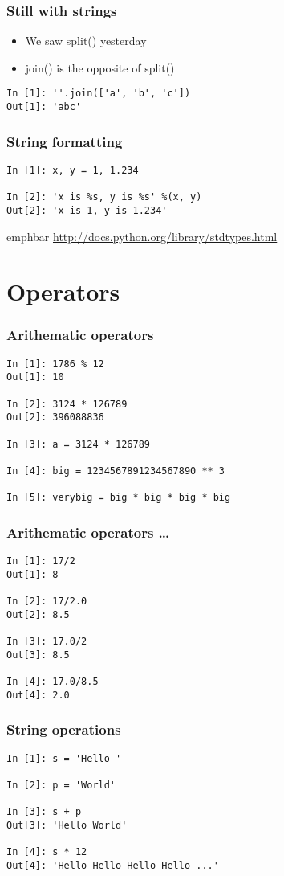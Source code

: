 \documentclass[14pt,compress]{beamer}
\newcommand{\emphbar}[1]
{\begin{beamercolorbox}[rounded=true]{emphbar} 
      {#1}
 \end{beamercolorbox}
}
\newcounter{time}
\newcommand{\inctime}[1]{\addtocounter{time}{#1}{\tiny \thetime\ m}}
\begin{document}
\begin{frame}[fragile]
\frametitle{Still with strings}
  \begin{itemize}
    \item We saw split() yesterday
    \item join() is the opposite of split()
  \end{itemize}
  \begin{lstlisting}
In [1]: ''.join(['a', 'b', 'c'])
Out[1]: 'abc'
  \end{lstlisting}
\end{frame}

\begin{frame}[fragile]
\frametitle{String formatting}
  \begin{lstlisting}
In [1]: x, y = 1, 1.234

In [2]: 'x is %s, y is %s' %(x, y)
Out[2]: 'x is 1, y is 1.234'
  \end{lstlisting}
\emphbar{
\url{http://docs.python.org/library/stdtypes.html}\\
}
\inctime{10}
\end{frame}

\section{Operators}
\begin{frame}[fragile]
  \frametitle{Arithematic operators}
  \begin{lstlisting}
In [1]: 1786 % 12
Out[1]: 10

In [2]: 3124 * 126789
Out[2]: 396088836

In [3]: a = 3124 * 126789

In [4]: big = 1234567891234567890 ** 3

In [5]: verybig = big * big * big * big
  \end{lstlisting}
\end{frame}

\begin{frame}[fragile]
  \frametitle{Arithematic operators \ldots}
  \begin{lstlisting}
In [1]: 17/2
Out[1]: 8

In [2]: 17/2.0
Out[2]: 8.5

In [3]: 17.0/2
Out[3]: 8.5

In [4]: 17.0/8.5
Out[4]: 2.0
  \end{lstlisting}
\end{frame}

\begin{frame}[fragile]
  \frametitle{String operations}
  \begin{lstlisting}
In [1]: s = 'Hello '

In [2]: p = 'World'

In [3]: s + p 
Out[3]: 'Hello World'

In [4]: s * 12 
Out[4]: 'Hello Hello Hello Hello ...'
  \end{lstlisting}
\end{frame}
\end{document}
